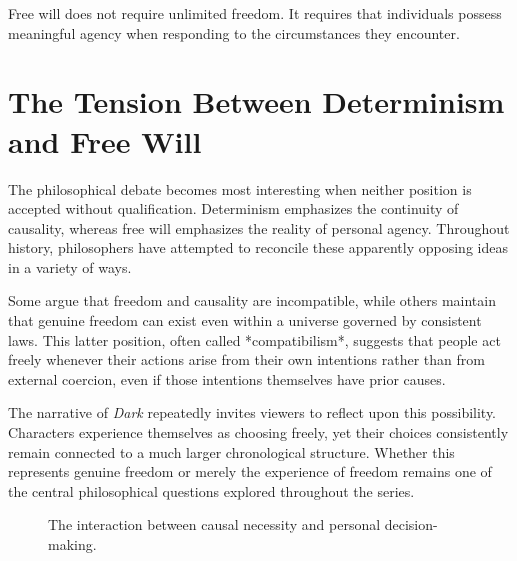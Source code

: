 \documentclass[12pt,oneside,openany]{book}
\begin{document}
\begin{tcolorbox}[colback=green!6,colframe=green!50!black,title=Key Concept]
Free will does not require unlimited freedom. It requires that individuals
possess meaningful agency when responding to the circumstances they encounter.
\end{tcolorbox}

\section{The Tension Between Determinism and Free Will}

The philosophical debate becomes most interesting when neither position is
accepted without qualification. Determinism emphasizes the continuity of
causality, whereas free will emphasizes the reality of personal agency.
Throughout history, philosophers have attempted to reconcile these apparently
opposing ideas in a variety of ways.

Some argue that freedom and causality are incompatible, while others maintain
that genuine freedom can exist even within a universe governed by consistent
laws. This latter position, often called *compatibilism*, suggests that people
act freely whenever their actions arise from their own intentions rather than
from external coercion, even if those intentions themselves have prior causes.

The narrative of \textit{Dark} repeatedly invites viewers to reflect upon this
possibility. Characters experience themselves as choosing freely, yet their
choices consistently remain connected to a much larger chronological structure.
Whether this represents genuine freedom or merely the experience of freedom
remains one of the central philosophical questions explored throughout the
series.
\begin{figure}[H]
\centering
{}
\caption{The interaction between causal necessity and personal decision-making.}
\end{figure}
\end{document}
